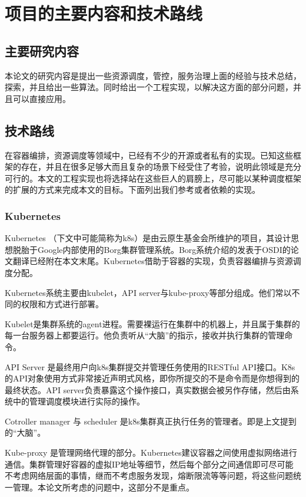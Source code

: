 \section{项目的主要内容和技术路线}

\subsection{主要研究内容}

本论文的研究内容是提出一些资源调度，管控，服务治理上面的经验与技术总结，探索，并且给出一些算法。同时给出一个工程实现，以解决这方面的部分问题，并且可以直接应用。

\subsection{技术路线}

在容器编排，资源调度等领域中，已经有不少的开源或者私有的实现。已知这些框架的存在，并且在很多足够大而且复杂的场景下经受住了考验，说明此领域是充分可行的。本文的工程实现也将选择站在这些巨人的肩膀上，尽可能以某种调度框架的扩展的方式来完成本文的目标。下面列出我们参考或者依赖的实现。

\subsubsection{Kubernetes}

Kubernetes （下文中可能简称为k8s）是由云原生基金会所维护的项目，其设计思想脱胎于Google内部使用的Borg集群管理系统。Borg系统介绍的发表于OSDI的论文翻译已经附在本文末尾。Kubernetes借助于容器的实现，负责容器编排与资源调度分配。

Kubernetes系统主要由kubelet，API server与kube-proxy等部分组成。他们常以不同的权限和方式进行部署。

Kubelet是集群系统的agent进程。需要裸运行在集群中的机器上，并且属于集群的每一台服务器上都要运行。他负责听从“大脑”的指示，接收并执行集群的管理命令。

API Server 是最终用户向k8s集群提交并管理任务使用的RESTful API接口。K8s的API对象使用方式非常接近声明式风格，即你所提交的不是命令而是你想得到的最终状态。API server负责暴露这个操作接口，真实数据会被另作存储，然后由系统中的管理调度模块进行实际的操作。

Cotroller manager 与 scheduler 是k8s集群真正执行任务的管理者。即是上文提到的“大脑”。

Kube-proxy 是管理网络代理的部分。Kubernetes建议容器之间使用虚拟网络进行通信。集群管理好容器的虚拟IP地址等细节，然后每个部分之间通信即可尽可能不考虑网络层面的事情，继而不考虑服务发现，熔断限流等等问题，将这些问题统一管理。本论文所考虑的问题中，这部分不是重点。

